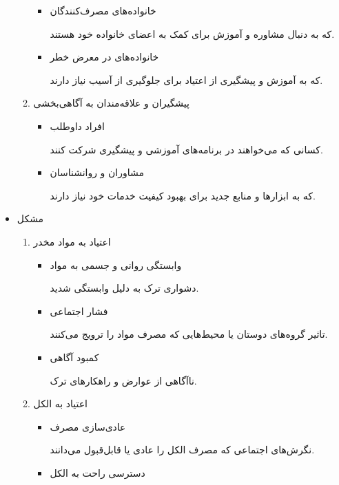 \documentclass[dvipsnames, svgnames, x11names, 11pt]{article}
\begin{document}
\begin{itemize}
\begin{enumerate}
\begin{itemize}
\item 
خانواده‌های مصرف‌کنندگان 

که به دنبال مشاوره و آموزش برای کمک به اعضای خانواده خود هستند.  

\item 
خانواده‌های در معرض خطر

که به آموزش و پیشگیری از اعتیاد برای جلوگیری از آسیب نیاز دارند.  
\end{itemize}

\item 
پیشگیران و علاقه‌مندان به آگاهی‌بخشی

\begin{itemize}
\item
افراد داوطلب

کسانی که می‌خواهند در برنامه‌های آموزشی و پیشگیری شرکت کنند.  

\item
مشاوران و روانشناسان

که به ابزارها و منابع جدید برای بهبود کیفیت خدمات خود نیاز دارند.  
\end{itemize}
\end{enumerate}

\item 
مشکل

\begin{enumerate}
\item 
اعتیاد به مواد مخدر  
\begin{itemize}
\item 
وابستگی روانی و جسمی به مواد

دشواری ترک به دلیل وابستگی شدید.  

\item 
فشار اجتماعی

تاثیر گروه‌های دوستان یا محیط‌هایی که مصرف مواد را ترویج می‌کنند.  

\item 
کمبود آگاهی

ناآگاهی از عوارض و راهکارهای ترک.  
\end{itemize}

\item 
اعتیاد به الکل  
\begin{itemize}
\item 
عادی‌سازی مصرف

نگرش‌های اجتماعی که مصرف الکل را عادی یا قابل‌قبول می‌دانند.  

\item 
دسترسی راحت به الکل


\end{itemize}
\end{enumerate}
\end{itemize}
\end{document}

